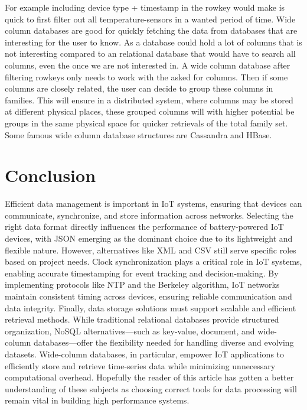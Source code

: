 \documentclass[article,a4paper]{IEEEtran}
\begin{document}
For example including device type + timestamp in the rowkey would make is quick to first filter out all temperature-sensors in a wanted period of time. Wide column databases are good for quickly fetching the data from databases that are interesting for the user to know. As a database could hold a lot of columns that is not interesting compared to an relational database that would have to search all columns, even the once we are not interested in. A wide column database after filtering rowkeys only needs to work with the asked for columns. Then if some columns are closely related, the user can decide to group these columns in families. This will ensure in a distributed system, where columns may be stored at different physical places, these grouped columns will with higher potential be groups in the same physical space for quicker retrievals of the total family set. Some famous wide column database structures are Cassandra and HBase.
\section{Conclusion}
Efficient data management is important in IoT systems, ensuring that devices can communicate, synchronize, and store information across networks. Selecting the right data format directly influences the performance of battery-powered IoT devices, with JSON emerging as the dominant choice due to its lightweight and flexible nature. However, alternatives like XML and CSV still serve specific roles based on project needs.
\newline\newline
Clock synchronization plays a critical role in IoT systems, enabling accurate timestamping for event tracking and decision-making. By implementing protocols like NTP and the Berkeley algorithm, IoT networks maintain consistent timing across devices, ensuring reliable communication and data integrity.
\newline\newline
Finally, data storage solutions must support scalable and efficient retrieval methods. While traditional relational databases provide structured organization, NoSQL alternatives—such as key-value, document, and wide-column databases—offer the flexibility needed for handling diverse and evolving datasets. Wide-column databases, in particular, empower IoT applications to efficiently store and retrieve time-series data while minimizing unnecessary computational overhead.
\newline\newline
Hopefully the reader of this article has gotten a better understanding of these subjects as choosing correct tools for data processing will remain vital in building high performance systems.  
\printbibliography
\end{document}
